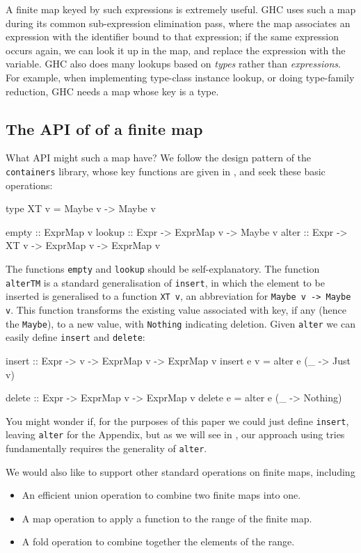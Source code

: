 \documentclass[acmsmall]{acmart}
\theoremstyle{theorem}
\theoremstyle{definition}
\theoremstyle{remark}
\begin{document}
A finite map keyed by such expressions is extremely useful.
GHC uses such a map during its common sub-expression
elimination pass, where the map associates an
expression with the identifier bound to that expression; if the same
expression occurs again, we can look it up in the map, and replace the
expression with the variable.
GHC also does many lookups based on \emph{types} rather than
\emph{expressions}.  For example, when implementing type-class
instance lookup, or doing type-family reduction, GHC needs a map whose
key is a type.

\subsection{The API of of a finite map}

What API might such a map have? We follow the design pattern of
the \lstinline{containers} library, whose key functions are given in ,
and seek these basic operations:
\begin{code}
  type XT v = Maybe v -> Maybe v

  empty  :: ExprMap v
  lookup :: Expr -> ExprMap v -> Maybe v
  alter  :: Expr -> XT v -> ExprMap v -> ExprMap v
\end{code}
The functions \lstinline{empty} and \lstinline{lookup} should be
self-explanatory.  The function \lstinline{alterTM} is a standard
generalisation of \lstinline{insert}, in which the element to be
inserted is generalised to a function \lstinline{XT v}, an
abbreviation for \lstinline{Maybe v -> Maybe v}.  This function
transforms the existing value associated with key, if any (hence the
\lstinline{Maybe}), to a new value, with \lstinline{Nothing}
indicating deletion.  Given \lstinline{alter} we can easily define \lstinline{insert} and \lstinline{delete}:
\begin{code}
  insert :: Expr -> v -> ExprMap v -> ExprMap v
  insert e v = alter e (\_ -> Just v)

  delete :: Expr -> ExprMap v -> ExprMap v
  delete e = alter e (\_ -> Nothing)
\end{code}
You might wonder if, for the purposes of this paper we could just define \lstinline{insert},
leaving \lstinline{alter} for the Appendix, but as we will see in , our
approach using tries fundamentally requires the generality of \lstinline{alter}.

We would also like to support other standard operations on finite maps, including
\begin{itemize}
\item An efficient union operation to combine two finite maps into one.
\item A map operation to apply a function to the range of the finite map.
\item A fold operation to combine together the elements of the range.
\end{itemize}
\end{document}
